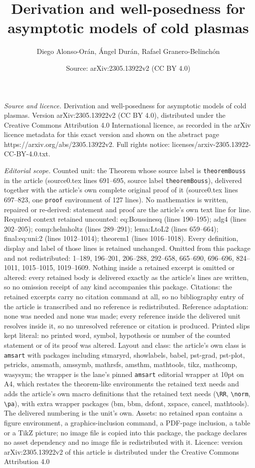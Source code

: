 \documentclass[10pt,a4paper]{amsart}
\title[Derivation and well-posedness for asymptotic models of cold ]{Derivation and well-posedness for asymptotic models of cold plasmas}
\author{Diego Alonso-Or\'an, \'Angel Dur\'an, Rafael Granero-Belinch\'on}
\date{Source: arXiv:2305.13922v2 (CC BY 4.0)}
\begin{document}
\maketitle

\noindent\emph{Source and licence.} Derivation and well-posedness for asymptotic models of cold plasmas. Version arXiv:2305.13922v2 (CC BY 4.0), distributed under the Creative Commons Attribution 4.0 International licence, as recorded in the arXiv licence metadata for this exact version and shown on the abstract page https://arxiv.org/abs/2305.13922v2. Full rights notice: licenses/arxiv-2305.13922-CC-BY-4.0.txt.\par\smallskip

\noindent\textit{Editorial scope.} Counted unit: the Theorem whose source label is \texttt{theoremBouss} in the article (source0.tex lines 691--695, source label \texttt{theoremBouss}), delivered together with the article's own complete original proof of it (source0.tex lines 697--823, one \texttt{proof} environment of 127 lines). No mathematics is written, repaired or re-derived: statement and proof are the article's own text line for line. Required context retained uncounted: eq:Boussinesq (lines 190--195); adg4 (lines 202--205); comp:helmholtz (lines 289--291); lema:LtoL2 (lines 659--664); final:eq:uni:2 (lines 1012--1014); theorem1 (lines 1016--1018). Every definition, display and label of those lines is retained unchanged. Omitted from this package and not redistributed: 1--189, 196--201, 206--288, 292--658, 665--690, 696--696, 824--1011, 1015--1015, 1019--1609. Nothing inside a retained excerpt is omitted or altered: every retained body is delivered exactly as the article's lines are written, so no omission receipt of any kind accompanies this package. Citations: the retained excerpts carry no citation command at all, so no bibliography entry of the article is transcribed and no reference is redistributed. Reference adaptation: none was needed and none was made; every reference inside the delivered unit resolves inside it, so no unresolved reference or citation is produced. Printed slips kept literal: no printed word, symbol, hypothesis or number of the counted statement or of its proof was altered. Layout and class: the article's own class is \texttt{amsart} with packages including stmaryrd, showlabels, babel, pst-grad, pst-plot, pstricks, amsmath, amssymb, mathrsfs, amsthm, mathtools, tikz, mathcomp, wasysym; the wrapper is the lane's pinned \texttt{amsart} editorial wrapper at 10pt on A4, which restates the theorem-like environments the retained text needs and adds the article's own macro definitions that the retained text needs (\texttt{\textbackslash RR}, \texttt{\textbackslash norm}, \texttt{\textbackslash pa}), with extra wrapper packages (bm, bbm, dsfont, xspace, cancel, mathtools). The delivered numbering is the unit's own. Assets: no retained span contains a figure environment, a graphics-inclusion command, a PDF-page inclusion, a table or a TikZ picture; no image file is copied into this package, the package declares no asset dependency and no image file is redistributed with it. Licence: version arXiv:2305.13922v2 of this article is distributed under the Creative Commons Attribution 4.0 
\end{document}
